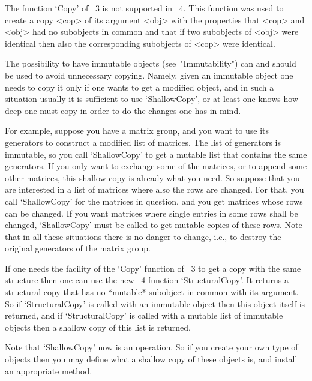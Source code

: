 
The function `Copy' of {\GAP}~3 is not supported in {\GAP}~4.
This function was used to create a copy <cop> of its argument <obj> with
the properties that <cop> and <obj> had no subobjects in common and that
if two subobjects of <obj> were identical then also the corresponding
subobjects of <cop> were identical.

The possibility to have immutable objects (see~"Immutability") can and
should be used to avoid unnecessary copying.
Namely, given an immutable object one needs to copy it only if one wants
to get a modified object, and in such a situation usually it is
sufficient to use `ShallowCopy', or at least one knows how deep one must
copy in order to do the changes one has in mind.

For example, suppose you have a matrix group, and you want to use its
generators to construct a modified list of matrices.
The list of generators is immutable, so you call `ShallowCopy' to get a
mutable list that contains the same generators.
If you only want to exchange some of the matrices, or to append some
other matrices, this shallow copy is already what you need.
So suppose that you are interested in a list of matrices where also
the rows are changed.  For that, you call `ShallowCopy' for the matrices
in question, and you get matrices whose rows can be changed.
If you want matrices where single entries in some rows shall be
changed, `ShallowCopy' must be called to get mutable copies of these
rows.
Note that in all these situations there is no danger to change, i.e.,
to destroy the original generators of the matrix group.

If one needs the facility of the `Copy' function of {\GAP}~3 to get a
copy with the same structure then one can use the new {\GAP}~4 function
`StructuralCopy'.
It returns a structural copy that has no *mutable* subobject in common
with its argument.
So if `StructuralCopy' is called with an immutable object then this
object itself is returned,
and if `StructuralCopy' is called with a mutable list of immutable
objects then a shallow copy of this list is returned.

Note that `ShallowCopy' now is an operation.
So if you create your own type of objects then you may define what a
shallow copy of these objects is, and install an appropriate method.



